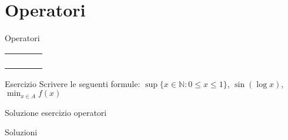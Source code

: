 \section{Operatori}
  \begin{frame}{Operatori}


	\begin{table}[h!]
	\begin{tabular}{p{2.3cm} p{2.3cm} p{2.3cm} p{2.3cm}}
	\hline
	\texttt{\min} & \texttt{\max} & \texttt{\inf} & \texttt{\sup} \\[0.4cm]
	\texttt{\gcd} & \texttt{\arg} & \texttt{\sin} & \texttt{\cos} \\[0.4cm]
	\texttt{\tan} & \texttt{\cot} & \texttt{\sec} & \texttt{\csc} \\[0.4cm]
	\texttt{\arcsin} & \texttt{\arccos} & \texttt{\log} & \texttt{\ln} \\
	\hline
	\end{tabular}
	\end{table}


	\begin{esercizio}{Esercizio}
	Scrivere le seguenti formule: $\sup \{ x \in \mathbb{N} : 0 \leq x \leq 1 \} $, $\sin (\log x)$, $\min_{x\in A} f(x)$
	\end{esercizio}

\end{frame}

\begin{frame}{Soluzione esercizio operatori}

    \begin{soluzione}{Soluzioni}
    \end{soluzione}

\end{frame}
